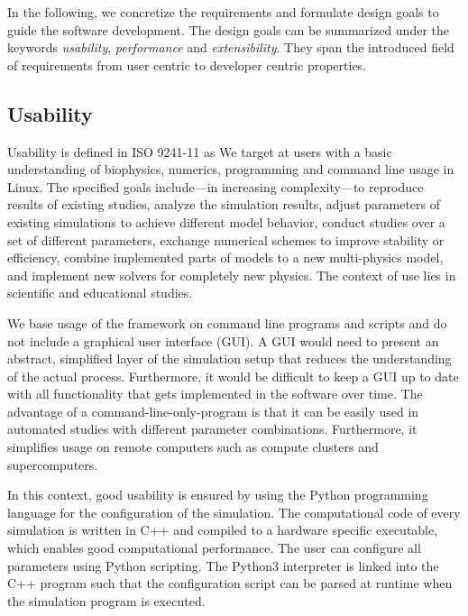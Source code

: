 In the following, we concretize the requirements and formulate design goals to guide the software development.
The design goals can be summarized under the keywords \emph{usability}, \emph{performance} and \emph{extensibility}. They span the introduced field of requirements from user centric to developer centric properties.

\subsection{Usability}
Usability is defined in ISO 9241-11 \cite{ISO9241} as   
We target at users with a basic understanding of biophysics, numerics, programming and command line usage in Linux. 
The specified goals include---in increasing complexity---to reproduce results of existing studies,  analyze the simulation results,  adjust parameters of existing simulations to achieve different model behavior, conduct studies over a set of different parameters,  exchange numerical schemes to improve stability or efficiency, combine implemented parts of models to a new multi-physics model, and implement new solvers for completely new physics. The context of use lies in scientific and educational studies. 

We base usage of the framework on command line programs and scripts and do not include a graphical user interface (GUI). A GUI would need to present an abstract, simplified layer of the simulation setup that reduces the understanding of the actual process. Furthermore, it would be difficult to keep a GUI up to date with all functionality that gets implemented in the software over time. The advantage of a command-line-only-program is that it can be easily used in automated studies with different parameter combinations. Furthermore, it simplifies usage on remote computers such as compute clusters and supercomputers.

In this context, good usability is ensured by using the Python programming language for the configuration of the simulation.
The computational code of every simulation is written in C++ and compiled to a hardware specific executable, which enables good computational performance. The user can configure all parameters using Python scripting. The Python3 interpreter is linked into the C++ program such that the configuration script can be parsed at runtime when the simulation program is executed.

